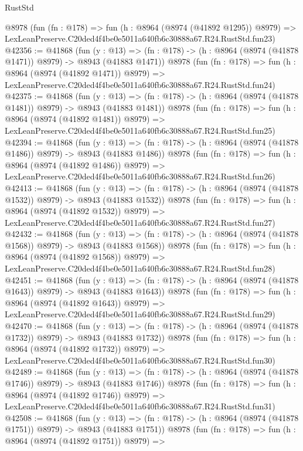 \begin{lexlean}{RustStd}
\begin{coremodule}
    @8978
    (fun (fn : @178) =>
    fun (h : @8964 (@8974 (@41892 @1295)) @8979) =>
    LexLeanPreserve.C20ded4f4be0e5011a640fb6c30888a67.R24.RustStd.fun23)
@42356 := @41868
    (fun (y : @13) =>
    (fn : @178) -> (h : @8964 (@8974 (@41878 @1471)) @8979) -> @8943 (@41883 @1471))
    @8978
    (fun (fn : @178) =>
    fun (h : @8964 (@8974 (@41892 @1471)) @8979) =>
    LexLeanPreserve.C20ded4f4be0e5011a640fb6c30888a67.R24.RustStd.fun24)
@42375 := @41868
    (fun (y : @13) =>
    (fn : @178) -> (h : @8964 (@8974 (@41878 @1481)) @8979) -> @8943 (@41883 @1481))
    @8978
    (fun (fn : @178) =>
    fun (h : @8964 (@8974 (@41892 @1481)) @8979) =>
    LexLeanPreserve.C20ded4f4be0e5011a640fb6c30888a67.R24.RustStd.fun25)
@42394 := @41868
    (fun (y : @13) =>
    (fn : @178) -> (h : @8964 (@8974 (@41878 @1486)) @8979) -> @8943 (@41883 @1486))
    @8978
    (fun (fn : @178) =>
    fun (h : @8964 (@8974 (@41892 @1486)) @8979) =>
    LexLeanPreserve.C20ded4f4be0e5011a640fb6c30888a67.R24.RustStd.fun26)
@42413 := @41868
    (fun (y : @13) =>
    (fn : @178) -> (h : @8964 (@8974 (@41878 @1532)) @8979) -> @8943 (@41883 @1532))
    @8978
    (fun (fn : @178) =>
    fun (h : @8964 (@8974 (@41892 @1532)) @8979) =>
    LexLeanPreserve.C20ded4f4be0e5011a640fb6c30888a67.R24.RustStd.fun27)
@42432 := @41868
    (fun (y : @13) =>
    (fn : @178) -> (h : @8964 (@8974 (@41878 @1568)) @8979) -> @8943 (@41883 @1568))
    @8978
    (fun (fn : @178) =>
    fun (h : @8964 (@8974 (@41892 @1568)) @8979) =>
    LexLeanPreserve.C20ded4f4be0e5011a640fb6c30888a67.R24.RustStd.fun28)
@42451 := @41868
    (fun (y : @13) =>
    (fn : @178) -> (h : @8964 (@8974 (@41878 @1643)) @8979) -> @8943 (@41883 @1643))
    @8978
    (fun (fn : @178) =>
    fun (h : @8964 (@8974 (@41892 @1643)) @8979) =>
    LexLeanPreserve.C20ded4f4be0e5011a640fb6c30888a67.R24.RustStd.fun29)
@42470 := @41868
    (fun (y : @13) =>
    (fn : @178) -> (h : @8964 (@8974 (@41878 @1732)) @8979) -> @8943 (@41883 @1732))
    @8978
    (fun (fn : @178) =>
    fun (h : @8964 (@8974 (@41892 @1732)) @8979) =>
    LexLeanPreserve.C20ded4f4be0e5011a640fb6c30888a67.R24.RustStd.fun30)
@42489 := @41868
    (fun (y : @13) =>
    (fn : @178) -> (h : @8964 (@8974 (@41878 @1746)) @8979) -> @8943 (@41883 @1746))
    @8978
    (fun (fn : @178) =>
    fun (h : @8964 (@8974 (@41892 @1746)) @8979) =>
    LexLeanPreserve.C20ded4f4be0e5011a640fb6c30888a67.R24.RustStd.fun31)
@42508 := @41868
    (fun (y : @13) =>
    (fn : @178) -> (h : @8964 (@8974 (@41878 @1751)) @8979) -> @8943 (@41883 @1751))
    @8978
    (fun (fn : @178) =>
    fun (h : @8964 (@8974 (@41892 @1751)) @8979) =>

\end{coremodule}
\end{lexlean}

